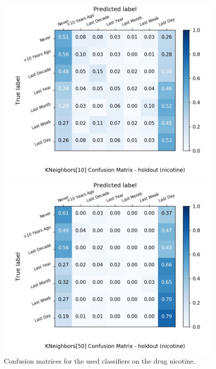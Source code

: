 \begin{figure}[H]
\begin{minipage}[b]{0.32\textwidth}
		\includegraphics[width=1.1\textwidth]{Plots/drugs/nicotine_KNeighbors_10_balance_False_holdout.png}
  \end{minipage}
	\begin{minipage}[b]{0.32\textwidth}
		\includegraphics[width=1.1\textwidth]{Plots/drugs/nicotine_KNeighbors_50_balance_False_holdout.png}
  \end{minipage}
	\caption{Confusion matrices for the used classifiers on the drug nicotine.}
\end{figure}

